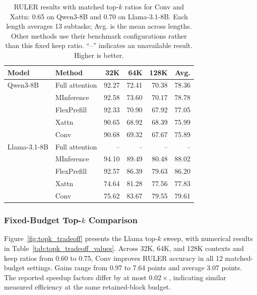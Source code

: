 \begin{table}[t]
    \centering
    \caption{RULER results with matched top-$k$ ratios for Conv and Xattn:
        0.65 on Qwen3-8B and 0.70 on Llama-3.1-8B.
        Each length averages 13 subtasks; Avg. is the mean across lengths.
        Other methods use their benchmark configurations rather than
        this fixed keep ratio. ``--'' indicates an unavailable result.
        Higher is better.}
    \label{tab:ruler_main_results}
    \small
    \begin{tabular}{llrrrr}
        \toprule
        Model & Method & 32K & 64K & 128K & Avg. \\
        \midrule
        Qwen3-8B & Full attention & 92.27 & 72.41 & 70.38 & 78.36 \\
        & MInference & 92.58 & 73.60 & 70.17 & 78.78 \\
        & FlexPrefill & 92.33 & 70.90 & 67.92 & 77.05 \\
        & Xattn & 90.65 & 68.92 & 68.39 & 75.99 \\
        & Conv & 90.68 & 69.32 & 67.67 & 75.89 \\
        \addlinespace
        Llama-3.1-8B & Full attention & -- & -- & -- & -- \\
        & MInference & 94.10 & 89.49 & 80.48 & 88.02 \\
        & FlexPrefill & 92.57 & 86.39 & 79.63 & 86.20 \\
        & Xattn & 74.64 & 81.28 & 77.56 & 77.83 \\
        & Conv & 75.62 & 83.67 & 79.55 & 79.61 \\
        \bottomrule
    \end{tabular}
\end{table}

\subsubsection{Fixed-Budget Top-$k$ Comparison}
\label{sec:topk_comparison}

Figure~\ref{fig:topk_tradeoff} presents the Llama top-$k$ sweep, with
numerical results in Table~\ref{tab:topk_tradeoff_values}. Across 32K, 64K, and 128K contexts and keep ratios
from 0.60 to 0.75, Conv improves RULER accuracy in all 12 matched-budget
settings. Gains range from 0.97 to 7.64 points and average 3.07 points.
The reported speedup factors differ by at most $0.02\times$, indicating
similar measured efficiency at the same retained-block budget.


